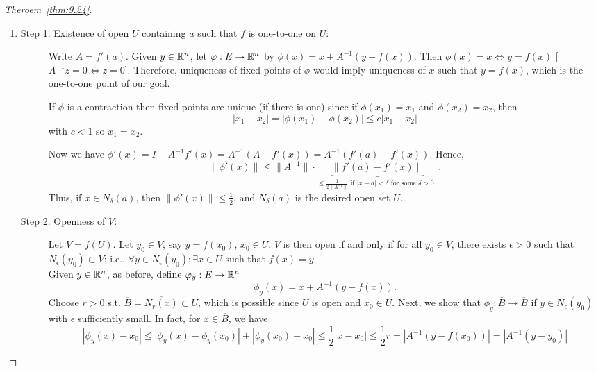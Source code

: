 \begin{proof}[Theroem~\ref{thm:9.24}]
	\hfill
	\begin{enumerate}
		\item
		      \begin{description}
			      \item[Step 1. Existence of open $U$ containing $a$ such that $f$ is one-to-one on $U$:]
			            Write $A=f'(a)$. Given $y \in \mathbb{R}^{n}$, let $\varphi:E\to \mathbb{R}^{n}$ by $\phi(x)=x+A^{-1}(y-f(x))$.
			            Then $\phi(x)=x \Leftrightarrow y=f(x)$ [$A^{-1}z=0 \Leftrightarrow z=0$].
			            Therefore, uniqueness of fixed points of $\phi$ would imply uniqueness of $x$ such that $y=f(x)$, which is the one-to-one point of our goal.
			            \begin{note}
				            If $\phi$ is a contraction then fixed points are unique (if there is one) since if $\phi(x_{1})=x_{1}$ and $\phi(x_{2})=x_{2}$, then \[
					            \left|x_{1}-x_{2}\right|=\left|\phi(x_{1})-\phi(x_{2})\right|\le c \left|x_{1}-x_{2}\right|
				            \] with $c<1$ so $x_{1}=x_{2}$.
			            \end{note}
			            Now we have $\phi'(x)=I-A^{-1}f'(x)=A^{-1}(A-f'(x))=A^{-1}(f'(a) - f'(x))$.
			            Hence, \[
				            \|\phi'(x)\|\le \|A^{-1}\|\cdot \underbrace{\|f'(a)-f'(x)\|}_{\le \frac{1}{2 \|A^{-1}\|} \text{ if $\left|x-a\right|<\delta$ for some $\delta>0$ }}
				            .\]
			            Thus, if $x \in N_{\delta}(a)$, then $\|\phi'(x)\|\le \frac{1}{2}$, and $N_\delta(a)$ is the desired open set $U$.
			      \item[Step 2. Openness of $V$:]
			            Let $V=f(U)$.
			            Let $y_{0} \in V$, say $y=f(x_{0})$, $x_{0} \in U$.
			            $V$ is then open if and only if for all $y_{0} \in V$, there exists $\epsilon>0$ such that $N_{\epsilon}(y_{0}) \subset V$; i.e., $\forall{y \in N_\epsilon (y_{0})}: \exists{x \in U} \text{ such that } f(x)=y$.\\
			            Given $y \in \mathbb{R}^{n}$, as before, define $\varphi_y: E\to \mathbb{R}^{n}$ \[
				            \phi_y(x)=x+A^{-1}(y-f(x))
				            .\]
			            Choose $r>0$ s.t. $\overline{B}=\overline{N_r(x)} \subset U$, which is possible since $U$ is open and $x_{0} \in U$.
			            Next, we show that $\phi_y:\overline{B}\to \overline{B}$ if $y \in N_{\epsilon}(y_{0})$ with $\epsilon$ sufficiently small.
			            In fact, for $x \in \overline{B}$, we have
			            \[
				            \left|\phi_y(x)-x_{0}\right|\le  \left|\phi_y(x)-\phi_y(x_{0})\right|+ \left|\phi_y(x_{0})-x_{0}\right| \le \frac{1}{2}\left|x-x_{0}\right|\le \frac{1}{2}r=\left|A^{-1}(y-f(x_{0}))\right|=\left|A^{-1}(y-y_{0})\right|
\]
\end{description}
\end{enumerate}
\end{proof}
